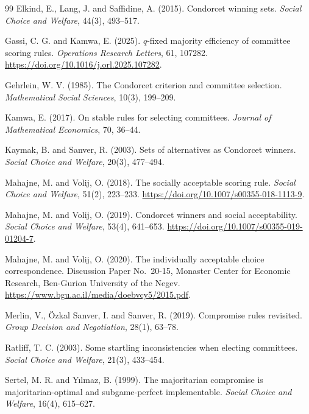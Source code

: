\documentclass[11pt]{article}
\theoremstyle{plain}
\theoremstyle{definition}
\begin{document}
\begin{thebibliography}{99}
 Elkind, E., Lang, J. and Saffidine, A. (2015). Condorcet winning sets. \emph{Social Choice and Welfare}, 44(3), 493--517.

 Gassi, C. G. and Kamwa, E. (2025). $q$-fixed majority efficiency of committee scoring rules. \emph{Operations Research Letters}, 61, 107282. \url{https://doi.org/10.1016/j.orl.2025.107282}.

 Gehrlein, W. V. (1985). The Condorcet criterion and committee selection. \emph{Mathematical Social Sciences}, 10(3), 199--209.

 Kamwa, E. (2017). On stable rules for selecting committees. \emph{Journal of Mathematical Economics}, 70, 36--44.

 Kaymak, B. and Sanver, R. (2003). Sets of alternatives as Condorcet winners. \emph{Social Choice and Welfare}, 20(3), 477--494.

 Mahajne, M. and Volij, O. (2018). The socially acceptable scoring rule. \emph{Social Choice and Welfare}, 51(2), 223--233. \url{https://doi.org/10.1007/s00355-018-1113-9}.

 Mahajne, M. and Volij, O. (2019). Condorcet winners and social acceptability. \emph{Social Choice and Welfare}, 53(4), 641--653. \url{https://doi.org/10.1007/s00355-019-01204-7}.

 Mahajne, M. and Volij, O. (2020). The individually acceptable choice correspondence. Discussion Paper No.~20-15, Monaster Center for Economic Research, Ben-Gurion University of the Negev. \url{https://www.bgu.ac.il/media/doebvcy5/2015.pdf}.

 Merlin, V., \"Ozkal Sanver, I. and Sanver, R. (2019). Compromise rules revisited. \emph{Group Decision and Negotiation}, 28(1), 63--78.

 Ratliff, T. C. (2003). Some startling inconsistencies when electing committees. \emph{Social Choice and Welfare}, 21(3), 433--454.

 Sertel, M. R. and Y{\i}lmaz, B. (1999). The majoritarian compromise is majoritarian-optimal and subgame-perfect implementable. \emph{Social Choice and Welfare}, 16(4), 615--627.

\end{thebibliography}
\end{document}
